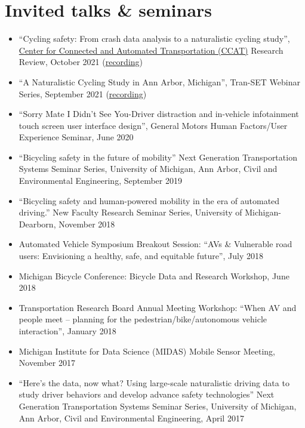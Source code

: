 \documentclass[11pt]{article}
\newenvironment{main}
{\begin{adjustwidth}{3em}{}}
{\end{adjustwidth}}
\begin{document}
\section*{Invited talks \& seminars}
\begin{main}

\begin{itemize}
    \item ``Cycling safety: From crash data analysis to a naturalistic cycling study'', \href{https://ccat.umtri.umich.edu/}{Center for Connected and Automated Transportation (CCAT)} Research Review, October 2021 (\href{https://www.youtube.com/watch?v=bbyOCaJ4P7s}{recording})
    \item ``A Naturalistic Cycling Study in Ann Arbor, Michigan'', Tran-SET Webinar Series, September 2021 (\href{https://www.youtube.com/watch?v=89XMKwFIjbk}{recording})
    \item ``Sorry Mate I Didn't See You-Driver distraction and in-vehicle infotainment touch screen user interface design'', General Motors Human Factors/User Experience Seminar, June 2020
    \item ``Bicycling safety in the future of mobility'' Next Generation Transportation Systems Seminar Series, University of Michigan, Ann Arbor, Civil and Environmental Engineering, September 2019
    \item ``Bicycling safety and human-powered mobility in the era of automated driving.'' New Faculty Research Seminar Series, University of Michigan-Dearborn, November 2018
    \item Automated Vehicle Symposium Breakout Session: ``AVs \& Vulnerable road users: Envisioning a healthy, safe, and equitable future'', July 2018
    \item Michigan Bicycle Conference: Bicycle Data and Research Workshop, June 2018
    \item Transportation Research Board Annual Meeting Workshop: ``When AV and people meet – planning for the pedestrian/bike/autonomous vehicle interaction'', January 2018
    \item Michigan Institute for Data Science (MIDAS) Mobile Sensor Meeting, November 2017
    \item ``Here's the data, now what? Using large-scale naturalistic driving data to study driver behaviors and develop advance safety technologies'' Next Generation Transportation Systems Seminar Series, University of Michigan, Ann Arbor, Civil and Environmental Engineering, April 2017
\end{itemize}


\end{main}
\end{document}

